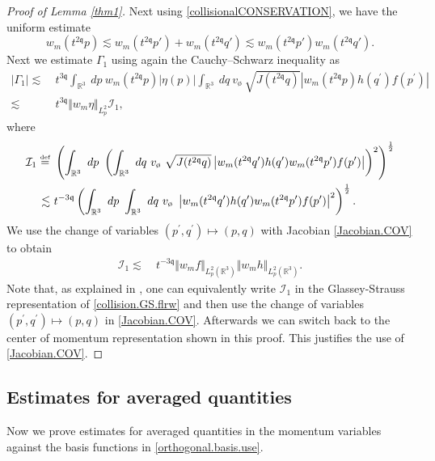 \documentclass[reqno]{amsart}
\newcommand{\eqdef }{\overset{\mbox{\tiny{def}}}{=}}
\newcommand{\pv}{p}
\newcommand{\qv}{q}
\def\norm#1{\big\Vert#1\big\Vert}
\newcommand{\threed}{{\mathbb R}^3}
\newcommand{\qq}{\mathfrak{q}}
\newcommand{\tqq}{t^{2\qq}}
\newcommand{\tTq}{t^{3\qq}}
\newcommand{\tmTq}{t^{-3\qq}}
\newcommand{\Emptyset}{\text{\o}}
\theoremstyle{definition}
\numberwithin{equation}{section}
\numberwithin{theorem}{section}
\begin{document}
\begin{proof}[Proof of Lemma \ref{thm1}]
Next using \eqref{collisionalCONSERVATION}, we have the uniform estimate
\begin{equation*}
    w_{m}(\tqq \pv) \lesssim w_{m}(\tqq \pv')+w_{m}(\tqq \qv')  \lesssim w_{m}(\tqq \pv')w_{m}(\tqq \qv').
\end{equation*}
Next we estimate $\Gamma_1$ using again the Cauchy--Schwarz inequality as
\begin{align*}
\left| \Gamma_1 \right|  
 \lesssim &~
\tTq  \int_{\mathbb{R}^3} ~  d\pv ~ w_{m}(\tqq \pv)\left| \eta (\pv) \right|\int_{\mathbb{R}^3} ~  d\qv 
~ v_{\Emptyset} ~
   \sqrt{J(\tqq q)}
 \left| w_{m}(\tqq \pv)h(q^\prime)f(p^\prime)\right|
 \\
  \lesssim &~
\tTq \norm{w_{m}\eta}_{L^2_p}
\mathcal{I}_1,
\end{align*}
where
\begin{align*}
\mathcal{I}_1  
\eqdef &~
\left( \int_{\mathbb{R}^3} ~  d\pv ~ 
\left(\int_{\mathbb{R}^3} ~  d\qv 
~ v_{\Emptyset} ~
   \sqrt{J(\tqq q)}
 \left| w_{m}(\tqq \qv')h(q^\prime)w_{m}(\tqq \pv')f(p^\prime)\right|\right)^{2}\right)^{\frac12}
  \\
  \lesssim &~
\tmTq 
\left( \int_{\mathbb{R}^3} ~  d\pv ~ 
\int_{\mathbb{R}^3} ~  d\qv 
~ v_{\Emptyset} ~
  \left| w_{m}(\tqq \qv')h(q^\prime)w_{m}(\tqq \pv')f(p^\prime)\right|^{2}\right)^{\frac12}.
\end{align*}
We use the change of variables $(p^\prime, q^\prime) \mapsto (p,q)$ with Jacobian \eqref{Jacobian.COV} to obtain 
\begin{align*}
\mathcal{I}_1   
 \lesssim &~
\tmTq \norm{w_{m}f}_{L^2_p(\threed)}\norm{w_{m}h}_{L^2_p(\threed)}.
\end{align*}
Note that, as explained in \cite{MR2765751}, one can equivalently write $\mathcal{I}_1$ in the Glassey-Strauss representation of \eqref{collision.GS.flrw} and then use the change of variables $(p^\prime, q^\prime) \mapsto (p,q)$ in \eqref{Jacobian.COV}.  Afterwards we can switch back to the center of momentum representation shown in this proof.  This justifies the use of \eqref{Jacobian.COV}.  \end{proof}




\subsection{Estimates for averaged quantities}\label{subaveragequanti} 

Now we prove estimates for averaged quantities in the momentum variables against the basis functions in \eqref{orthogonal.basis.use}.  
\end{document}
